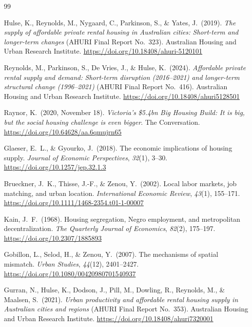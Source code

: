 \documentclass[10pt,a4paper]{article}
\begin{document}
\begingroup
\small
\renewcommand{\section}[2]{}
\begin{thebibliography}{99}

Hulse, K., Reynolds, M., Nygaard, C., Parkinson, S., \& Yates, J.\ (2019). \textit{The supply of affordable private rental housing in Australian cities: Short-term and longer-term changes} (AHURI Final Report No.\ 323). Australian Housing and Urban Research Institute.
\url{https://doi.org/10.18408/ahuri-5120101}

Reynolds, M., Parkinson, S., De Vries, J., \& Hulse, K.\ (2024). \textit{Affordable private rental supply and demand: Short-term disruption (2016--2021) and longer-term structural change (1996--2021)} (AHURI Final Report No.\ 416). Australian Housing and Urban Research Institute.
\url{https://doi.org/10.18408/ahuri5128501}

Raynor, K.\ (2020, November 18). \textit{Victoria's \$5.4bn Big Housing Build: It is big, but the social housing challenge is even bigger}.
The Conversation.
\url{https://doi.org/10.64628/aa.6qmujrn65}

Glaeser, E.\ L., \& Gyourko, J.\ (2018). The economic implications of housing supply.
\textit{Journal of Economic Perspectives}, \textit{32}(1), 3--30.
\url{https://doi.org/10.1257/jep.32.1.3}

Brueckner, J.\ K., Thisse, J.-F., \& Zenou, Y.\ (2002). Local labor markets, job matching, and urban location.
\textit{International Economic Review}, \textit{43}(1), 155--171.
\url{https://doi.org/10.1111/1468-2354.t01-1-00007}

Kain, J.\ F.\ (1968). Housing segregation, Negro employment, and metropolitan decentralization.
\textit{The Quarterly Journal of Economics}, \textit{82}(2), 175--197.
\url{https://doi.org/10.2307/1885893}

Gobillon, L., Selod, H., \& Zenou, Y.\ (2007). The mechanisms of spatial mismatch.
\textit{Urban Studies}, \textit{44}(12), 2401--2427.
\url{https://doi.org/10.1080/00420980701540937}

Gurran, N., Hulse, K., Dodson, J., Pill, M., Dowling, R., Reynolds, M., \& Maalsen, S.\ (2021). \textit{Urban productivity and affordable rental housing supply in Australian cities and regions} (AHURI Final Report No.\ 353). Australian Housing and Urban Research Institute.
\url{https://doi.org/10.18408/ahuri7320001}


\end{thebibliography}
\end{document}

